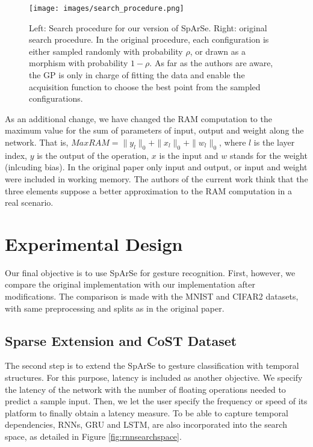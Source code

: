 \documentclass[a4paper, twocolumn]{article}
\begin{document}
\begin{figure}
	\centering
	\texttt{[image: images/search\_procedure.png]}
	\caption{Left: Search procedure for our version of SpArSe. Right: original search procedure. In the original procedure, each configuration is either sampled randomly with probability $\rho$, or drawn as a morphism with probability $1 - \rho$. As far as the authors are aware, the GP is only in charge of fitting the data and enable the acquisition function to choose the best point from the sampled configurations.}
	\label{fig:searchprocedure}
\end{figure}

As an additional change, we have changed the RAM computation to the maximum value for the sum of parameters of input, output and weight along the network. That is, $MaxRAM = \|y_{l}\|_{0} + \|x_{l}\|_{0} + \|w_{l}\|_{0}$, where $l$ is the layer index, $y$ is the output of the operation, $x$ is the input and $w$ stands for the weight (inlcuding bias). In the original paper only input and output, or input and weight were included in working memory. The authors of the current work think that the three elements suppose a better approximation to the RAM computation in a real scenario.

\section{Experimental Design}


Our final objective is to use SpArSe for gesture recognition. First, however, we compare the original implementation with our implementation after modifications. The comparison is made with the MNIST and CIFAR2 \cite{Jose2013} datasets, with same preprocessing and splits as in the original paper.

\subsection{Sparse Extension and CoST Dataset}\label{Dataset}

The second step is to extend the SpArSe to gesture classification with temporal structures. For this purpose, latency is included as another objective. We specify the latency of the network with the number of floating operations needed to predict a sample input. Then, we let the user specify the frequency or speed of its platform to finally obtain a latency measure. To be able to capture temporal dependencies, RNNs, GRU and LSTM, are also incorporated into the search space, as detailed in Figure \ref{fig:rnnsearchspace}. 
\end{document}
